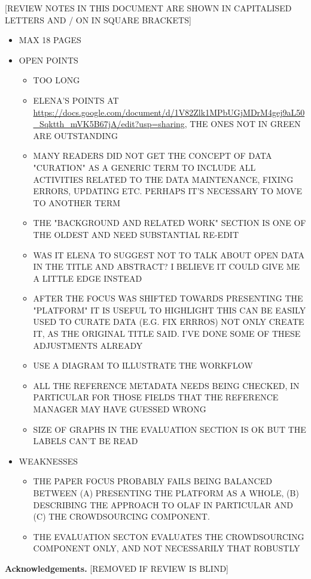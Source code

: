 \documentclass{llncs}
\begin{document}
[REVIEW NOTES IN THIS DOCUMENT ARE SHOWN IN CAPITALISED LETTERS AND / ON IN SQUARE BRACKETS] 
\begin{itemize}

    \item MAX 18 PAGES
    \item OPEN POINTS
        \begin{itemize}
            \item TOO LONG
            \item ELENA'S POINTS AT \url{https://docs.google.com/document/d/1V82Zlk1MPbUGjMDrM4gej9aL50_Sqktth_mVK5B67jA/edit?usp=sharing}, THE ONES NOT IN GREEN ARE OUTSTANDING
            \item MANY READERS DID NOT GET THE CONCEPT OF DATA "CURATION" AS A GENERIC TERM TO INCLUDE ALL ACTIVITIES RELATED TO THE DATA MAINTENANCE, FIXING ERRORS, UPDATING ETC.  PERHAPS IT'S NECESSARY TO MOVE TO ANOTHER TERM
            \item THE "BACKGROUND AND RELATED WORK" SECTION IS ONE OF THE OLDEST AND NEED SUBSTANTIAL RE-EDIT
            \item WAS IT ELENA TO SUGGEST NOT TO TALK ABOUT OPEN DATA IN THE TITLE AND ABSTRACT? I BELIEVE IT COULD GIVE ME A LITTLE EDGE INSTEAD
            \item AFTER THE FOCUS WAS SHIFTED TOWARDS PRESENTING THE "PLATFORM" IT IS USEFUL TO HIGHLIGHT THIS CAN BE EASILY USED TO CURATE DATA (E.G. FIX ERRROS) NOT ONLY CREATE IT, AS THE ORIGINAL TITLE SAID. I'VE DONE SOME OF THESE ADJUSTMENTS ALREADY
            \item USE A DIAGRAM TO ILLUSTRATE THE WORKFLOW
            \item ALL THE REFERENCE METADATA NEEDS BEING CHECKED, IN PARTICULAR FOR THOSE FIELDS THAT THE REFERENCE MANAGER MAY HAVE GUESSED WRONG
            \item SIZE OF GRAPHS IN THE EVALUATION SECTION IS OK BUT THE LABELS CAN'T BE READ
        \end{itemize}
    \item WEAKNESSES 
        \begin{itemize}
            \item THE PAPER FOCUS PROBABLY FAILS BEING BALANCED BETWEEN (A) PRESENTING THE PLATFORM AS A WHOLE, (B) DESCRIBING THE APPROACH TO OLAF IN PARTICULAR AND (C) THE CROWDSOURCING COMPONENT.  
            \item THE EVALUATION SECTON EVALUATES THE CROWDSOURCING COMPONENT ONLY, AND NOT NECESSARILY THAT ROBUSTLY
        \end{itemize}
\end{itemize}









\textbf{Acknowledgements.} [REMOVED IF REVIEW IS BLIND]


\end{document}
